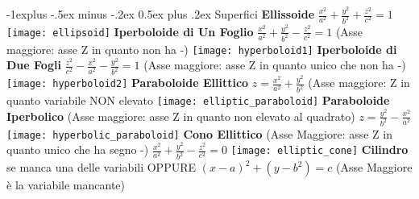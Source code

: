\documentclass[10pt,landscape]{article}
\makeatletter
\renewcommand{\subsection}{\@startsection{subsection}{2}{0mm}%
                                {-1explus -.5ex minus -.2ex}%
                                {0.5ex plus .2ex}%
                                {\normalfont\normalsize\bfseries}}
\makeatother
\begin{document}
\begin{multicols*}{5}
\subsection{Superfici}
\textbf{Ellissoide}\newline
$ \frac{x^2}{a^2}+\frac{y^2}{b^2}+\frac{z^2}{c^2} = 1 $\newline
\texttt{[image: ellipsoid]}\newline
\textbf{Iperboloide di Un Foglio }\newline
$ \frac{x^2}{a^2}+\frac{y^2}{b^2}-\frac{z^2}{c^2} = 1 $\newline
(Asse maggiore: asse Z in quanto non ha -)\newline
\texttt{[image: hyperboloid1]}\newline
\textbf{Iperboloide di Due Fogli }\newline
$ \frac{z^2}{c^2}-\frac{x^2}{a^2}-\frac{y^2}{b^2} = 1 $\newline
(Asse maggiore: asse Z in quanto unico che non ha -)\newline
\texttt{[image: hyperboloid2]}\newline
\textbf{Paraboloide Ellittico}\newline
$ z=\frac{x^2}{a^2}+\frac{y^2}{b^2} $\newline
(Asse maggiore: Z in quanto variabile NON elevato
\texttt{[image: elliptic\_paraboloid]}\newline
\textbf{Paraboloide Iperbolico}\newline
(Asse maggiore: asse Z in quanto non elevato al quadrato)\newline
$ z=\frac{y^2}{b^2}-\frac{x^2}{a^2} $\newline
\texttt{[image: hyperbolic\_paraboloid]}\newline
\textbf{Cono Ellittico}\newline
(Asse Maggiore: asse Z in quanto unico che ha segno -)\newline
$ \frac{x^2}{a^2}+\frac{y^2}{b^2}-\frac{z^2}{c^2} = 0 $\newline
\texttt{[image: elliptic\_cone]}\newline
\textbf{Cilindro}\newline
se manca una delle variabili \newline
OPPURE\newline
$ (x-a)^2+(y-b^2) = c $\newline
(Asse Maggiore \`e la variabile mancante)


\end{multicols*}
\end{document}
